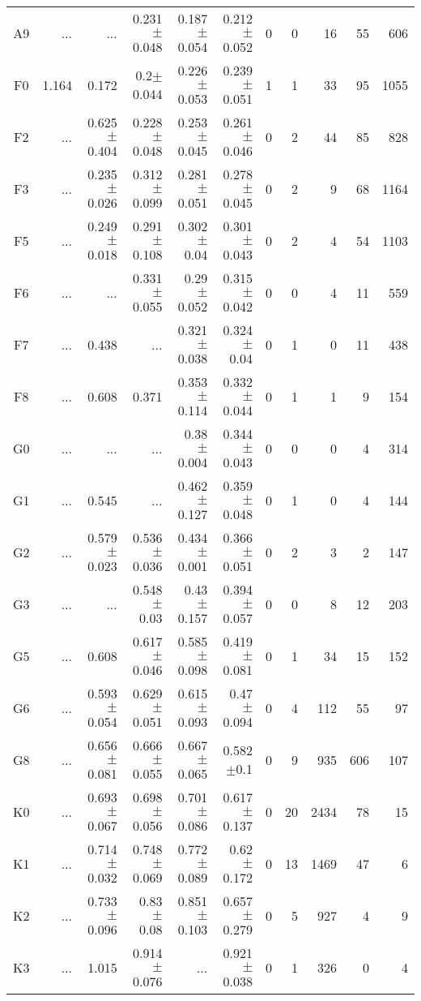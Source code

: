 \begin{table}[t]
\begin{table}[t]
\begin{center}
\begin{tabular}{c|rrrrr|rrrrr}
    A9	&	 ...	&	 ...	&	0.231$\pm$0.048	&	0.187$\pm$0.054	&	0.212$\pm$0.052	&	0	&	0	&	16	&	55	&	606	\\
    F0	&	1.164	&	0.172	&	0.2$\pm$0.044	&	0.226$\pm$0.053	&	0.239$\pm$0.051	&	1	&	1	&	33	&	95	&	1055	\\
    F2	&	 ...	&	0.625$\pm$0.404	&	0.228$\pm$0.048	&	0.253$\pm$0.045	&	0.261$\pm$0.046	&	0	&	2	&	44	&	85	&	828	\\
    F3	&	 ...	&	0.235$\pm$0.026	&	0.312$\pm$0.099	&	0.281$\pm$0.051	&	0.278$\pm$0.045	&	0	&	2	&	9	&	68	&	1164	\\
    F5	&	 ...	&	0.249$\pm$0.018	&	0.291$\pm$0.108	&	0.302$\pm$0.04	&	0.301$\pm$0.043	&	0	&	2	&	4	&	54	&	1103	\\
    F6	&	 ...	&	 ...	&	0.331$\pm$0.055	&	0.29$\pm$0.052	&	0.315$\pm$0.042	&	0	&	0	&	4	&	11	&	559	\\
    F7	&	 ...	&	0.438	&	 ...	&	0.321$\pm$0.038	&	0.324$\pm$0.04	&	0	&	1	&	0	&	11	&	438	\\
    F8	&	 ...	&	0.608	&	0.371	&	0.353$\pm$0.114	&	0.332$\pm$0.044	&	0	&	1	&	1	&	9	&	154	\\
    G0	&	 ...	&	 ...	&	 ...	&	0.38$\pm$0.004	&	0.344$\pm$0.043	&	0	&	0	&	0	&	4	&	314	\\
    G1	&	 ...	&	0.545	&	 ...	&	0.462$\pm$0.127	&	0.359$\pm$0.048	&	0	&	1	&	0	&	4	&	144	\\
    G2	&	 ...	&	0.579$\pm$0.023	&	0.536$\pm$0.036	&	0.434$\pm$0.001	&	0.366$\pm$0.051	&	0	&	2	&	3	&	2	&	147	\\
    G3	&	 ...	&	 ...	&	0.548$\pm$0.03	&	0.43$\pm$0.157	&	0.394$\pm$0.057	&	0	&	0	&	8	&	12	&	203	\\
    G5	&	 ...	&	0.608	&	0.617$\pm$0.046	&	0.585$\pm$0.098	&	0.419$\pm$0.081	&	0	&	1	&	34	&	15	&	152	\\
    G6	&	 ...	&	0.593$\pm$0.054	&	0.629$\pm$0.051	&	0.615$\pm$0.093	&	0.47$\pm$0.094	&	0	&	4	&	112	&	55	&	97	\\
    G8	&	 ...	&	0.656$\pm$0.081	&	0.666$\pm$0.055	&	0.667$\pm$0.065	&	0.582$\pm$0.1	&	0	&	9	&	935	&	606	&	107	\\
    K0	&	 ...	&	0.693$\pm$0.067	&	0.698$\pm$0.056	&	0.701$\pm$0.086	&	0.617$\pm$0.137	&	0	&	20	&	2434	&	78	&	15	\\
    K1	&	 ...	&	0.714$\pm$0.032	&	0.748$\pm$0.069	&	0.772$\pm$0.089	&	0.62$\pm$0.172	&	0	&	13	&	1469	&	47	&	6	\\
    K2	&	 ...	&	0.733$\pm$0.096	&	0.83$\pm$0.08	&	0.851$\pm$0.103	&	0.657$\pm$0.279	&	0	&	5	&	927	&	4	&	9	\\
    K3	&	 ...	&	1.015	&	0.914$\pm$0.076	&	 ...	&	0.921$\pm$0.038	&	0	&	1	&	326	&	0	&	4	\\

\end{tabular}
\end{center}
\end{table}
\end{table}
